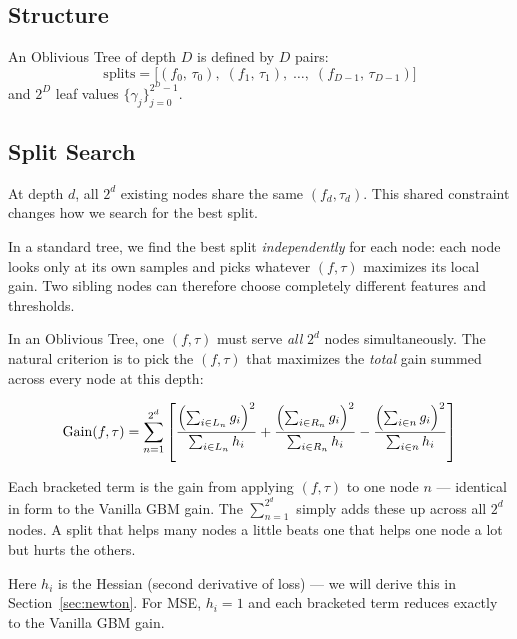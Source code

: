 \documentclass[11pt, a4paper]{article}
\begin{document}
\subsection{Structure}

An Oblivious Tree of depth $D$ is defined by $D$ pairs:
\[
\mathrm{splits} = \bigl[(f_0,\,\tau_0),\;(f_1,\,\tau_1),\;\ldots,\;(f_{D-1},\,\tau_{D-1})\bigr]
\]
and $2^D$ leaf values $\{\gamma_j\}_{j=0}^{2^D-1}$.

\subsection{Split Search}

At depth $d$, all $2^d$ existing nodes share the same $(f_d, \tau_d)$.
This shared constraint changes how we search for the best split.

In a standard tree, we find the best split \emph{independently} for each node:
each node looks only at its own samples and picks whatever $(f, \tau)$ maximizes
its local gain. Two sibling nodes can therefore choose completely different
features and thresholds.

In an Oblivious Tree, one $(f, \tau)$ must serve \emph{all} $2^d$ nodes simultaneously.
The natural criterion is to pick the $(f, \tau)$ that maximizes the \emph{total}
gain summed across every node at this depth:

\[
\mathrm{Gain}(f, \tau) = \sum_{n=1}^{2^d}
\left[
  \frac{\Bigl(\sum_{i\in L_n}g_i\Bigr)^2}{\sum_{i\in L_n}h_i}
+ \frac{\Bigl(\sum_{i\in R_n}g_i\Bigr)^2}{\sum_{i\in R_n}h_i}
- \frac{\Bigl(\sum_{i\in n}g_i\Bigr)^2}{\sum_{i\in n}h_i}
\right]
\]

Each bracketed term is the gain from applying $(f, \tau)$ to one node $n$
--- identical in form to the Vanilla GBM gain.
The $\sum_{n=1}^{2^d}$ simply adds these up across all $2^d$ nodes.
A split that helps many nodes a little beats one that helps one node a lot
but hurts the others.

Here $h_i$ is the Hessian (second derivative of loss) --- we will
derive this in Section~\ref{sec:newton}.
For MSE, $h_i = 1$ and each bracketed term reduces exactly to the Vanilla GBM gain.
\end{document}
